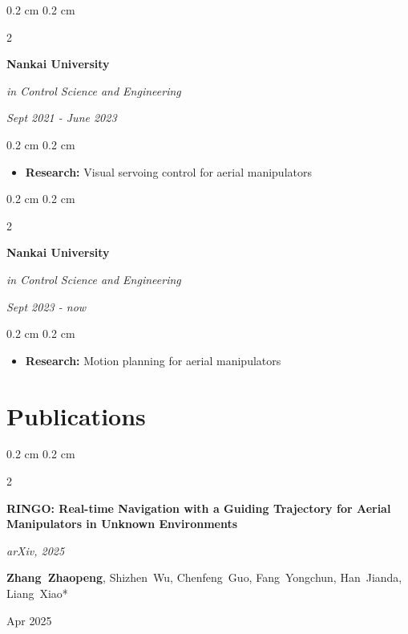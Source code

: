 \documentclass[10pt, letterpaper]{article}
\newenvironment{highlights}{
  \begin{itemize}[
    topsep=0.10 cm,
    parsep=0.10 cm,
    partopsep=0pt,
    itemsep=0pt,
    leftmargin=0.4 cm + 10pt
  ]
}{
    \end{itemize}
} %
\newenvironment{onecolentry}{
    \begin{adjustwidth}{
        0.2 cm
    }{
        0.2 cm
    }
}{
    \end{adjustwidth}
} %
\newenvironment{twocolentry}[2][]{
    \onecolentry
    \def\secondColumn{#2}
    \setcolumnwidth{\fill, 4.0 cm}
    \begin{paracol}{2}
}{
    \switchcolumn \raggedleft \secondColumn
    \end{paracol}
    \endonecolentry
} %
\begin{document}
  \begin{twocolentry}{\textit{Sept 2021 - June 2023}}
    \textbf{Nankai University}

     \textit{in Control Science and Engineering}
  \end{twocolentry}
  
  \vspace{0.1cm}
  
  \begin{onecolentry}
    \begin{highlights}
      \item \textbf{Research:} Visual servoing control for aerial manipulators
    \end{highlights}
  \end{onecolentry}

  \vspace{0.1cm}

  \begin{twocolentry}{\textit{Sept 2023 - now}}
    \textbf{Nankai University}

     \textit{in Control Science and Engineering}
  \end{twocolentry}
  
  \vspace{0.1cm}
  
  \begin{onecolentry}
    \begin{highlights}
      \item \textbf{Research:} Motion planning for aerial manipulators
    \end{highlights}
  \end{onecolentry}

\section{Publications}
\begin{twocolentry}{Apr 2025}
  \textbf{RINGO: Real-time Navigation with a Guiding Trajectory for Aerial Manipulators in Unknown Environments}
  \vspace{0.10 cm}

  \textit{arXiv, 2025}
  \vspace{0.10 cm}

  \mbox{\textbf{Zhang Zhaopeng}}, \mbox{Shizhen Wu}, \mbox{Chenfeng Guo}, \mbox{Fang Yongchun}, \mbox{Han Jianda}, \mbox{Liang Xiao*}
\end{twocolentry}
\vspace{0.3 cm}
\end{document}
